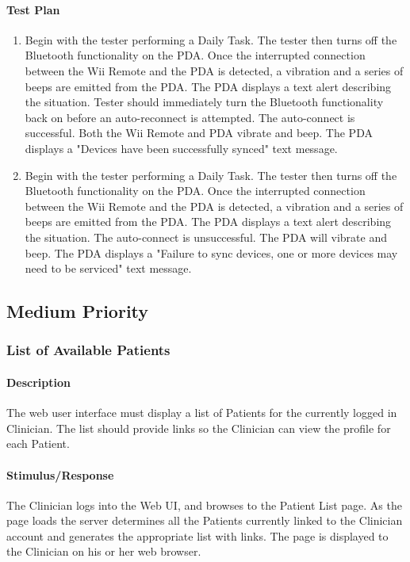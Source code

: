 \documentclass{article}
\begin{document}
\paragraph {Test Plan}
\begin{enumerate}
\item Begin with the tester performing a Daily Task. The tester then turns off the Bluetooth functionality on the PDA. Once the interrupted connection between the Wii Remote and the PDA is detected, a vibration and a series of beeps are emitted from the PDA. The PDA displays a text alert describing the situation. Tester should immediately turn the Bluetooth functionality back on before an auto-reconnect is attempted. The auto-connect is successful. Both the Wii Remote and PDA vibrate and beep. The PDA displays a "Devices have been successfully synced" text message.
\item Begin with the tester performing a Daily Task. The tester then turns off the Bluetooth functionality on the PDA. Once the interrupted connection between the Wii Remote and the PDA is detected, a vibration and a series of beeps are emitted from the PDA. The PDA displays a text alert describing the situation. The auto-connect is unsuccessful. The PDA will vibrate and beep. The PDA displays a "Failure to sync devices, one or more devices may need to be serviced" text message.
\end{enumerate}


\subsection{Medium Priority}

\subsubsection{List of Available Patients}\label{sec: List Patients}

\paragraph{Description}
The web user interface must display a list of Patients for the currently logged in Clinician. The list should provide links so the Clinician can view the profile for each Patient.

\paragraph{Stimulus/Response}
The Clinician logs into the Web UI, and browses to the Patient List page.  As the page loads the server determines all the Patients currently linked to the Clinician account and generates the appropriate list with links. The page is displayed to the Clinician on his or her web browser.
\end{document}
